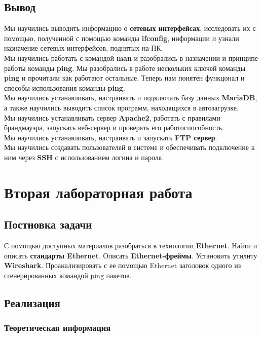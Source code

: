 \subsection{Вывод}
Мы научились выводить информацию о \textbf{сетевых интерфейсах}, исследовать их с помощью, полученной с помощью команды \textbf{ifconfig}, информации и узнали назначение сетевых интерфейсов, поднятых на ПК.\\
Мы научились работать с командой \textbf{man} и разобрались в назначении и принципе работы команды \textbf{ping}. Мы разобрались в работе нескольких ключей команды \textbf{ping} и прочитали как работают остальные. Теперь нам понятен функцонал и способы использования команды \textbf{ping}.\\
Мы научились устанавливать, настраивать и подключать базу данных \textbf{MariaDB}, а также  научились выводить список программ, находящихся в автозагрузке.\\
Мы научились устанавливать сервер \textbf{Apache2}, работать с правилами брандмауэра, запускать веб-сервер и проверять его работоспособность.\\
Мы научились устанавливать, настраивать и запускать \textbf{FTP сервер}.\\
Мы научились создавать пользователей в системе и обеспечивать подключение к ним через \textbf{SSH} с использованием логина и пароля.

\newpage

\section{Вторая лабораторная работа}

\subsection{Постновка задачи}
С помощью доступных материалов разобраться в технологии \textbf{Ethernet}. Найти и
описать \textbf{стандарты Ethernet}. Описать \textbf{Ethernet-фреймы}. Установить утилиту \textbf{Wireshark}. Проанализировать с ее помощью Ethernet заголовок одного из сгенерированных командой ping пакетов.

\subsection{Реализация}

\subsubsection{Теоретическая информация\cite{Ethernetfr}\cite{main}\cite{StEthernet}}

